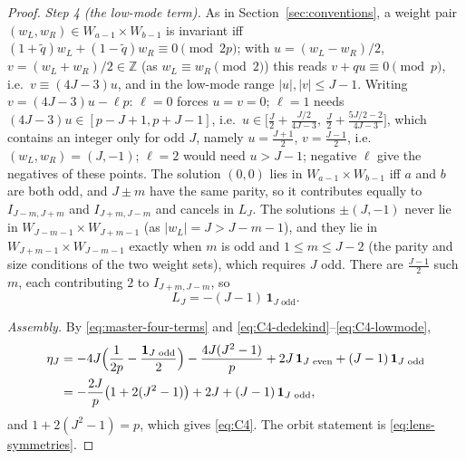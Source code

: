 \documentclass[11pt]{article}
\theoremstyle{definition}
\newcommand{\Z}{\mathbb Z}
\newcommand{\ind}{\mathbf 1}
\begin{document}
\begin{proof}
\emph{Step 4 (the low-mode term).}  As in Section~\ref{sec:conventions},
a weight pair $(w_L,w_R)\in W_{a-1}\times W_{b-1}$ is invariant iff
$(1+\tilde q)w_L+(1-\tilde q)w_R\equiv0\pmod{2p}$; with
$u=(w_L-w_R)/2$, $v=(w_L+w_R)/2\in\Z$ (as $w_L\equiv w_R\pmod2$) this
reads $v+qu\equiv0\pmod p$, i.e.\ $v\equiv(4J-3)u$, and in the low-mode
range $|u|,|v|\leq J-1$.  Writing $v=(4J-3)u-\ell p$: $\ell=0$ forces
$u=v=0$; $\ell=1$ needs $(4J-3)u\in[p-J+1,p+J-1]$, i.e.\
$u\in\bigl[\frac J2+\frac{J/2}{4J-3},\ \frac J2+\frac{5J/2-2}{4J-3}\bigr]$,
which contains an integer only for odd $J$, namely $u=\frac{J+1}2$,
$v=\frac{J-1}2$, i.e.\ $(w_L,w_R)=(J,-1)$; $\ell=2$ would need $u>J-1$;
negative $\ell$ give the negatives of these points.  The solution
$(0,0)$ lies in $W_{a-1}\times W_{b-1}$ iff $a$ and $b$ are both odd, and
$J\pm m$ have the same parity, so it contributes equally to
$I_{J-m,J+m}$ and $I_{J+m,J-m}$ and cancels in $L_J$.  The solutions
$\pm(J,-1)$ never lie in $W_{J-m-1}\times W_{J+m-1}$ (as
$|w_L|=J>J-m-1$), and they lie in $W_{J+m-1}\times W_{J-m-1}$ exactly
when $m$ is odd and $1\leq m\leq J-2$ (the parity and size conditions of
the two weight sets), which requires $J$ odd.  There are $\frac{J-1}2$
such $m$, each contributing $2$ to $I_{J+m,J-m}$, so
\begin{equation}
 L_J=-(J-1)\,\ind_{J\text{ odd}} .
 \label{eq:C4-lowmode}
\end{equation}

\emph{Assembly.}  By \eqref{eq:master-four-terms} and
\eqref{eq:C4-dedekind}--\eqref{eq:C4-lowmode},
\begin{align*}
 \eta_J&=-4J\Bigl(\frac1{2p}-\frac{\ind_{J\text{ odd}}}2\Bigr)
 -\frac{4J(J^2-1)}p+2J\,\ind_{J\text{ even}}+(J-1)\,\ind_{J\text{ odd}}\\
 &=-\frac{2J}p\bigl(1+2(J^2-1)\bigr)+2J+(J-1)\,\ind_{J\text{ odd}},
\end{align*}
and $1+2(J^2-1)=p$, which gives \eqref{eq:C4}.  The orbit statement is
\eqref{eq:lens-symmetries}.
\end{proof}
\end{document}

